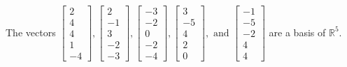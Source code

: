 \begin{exercise}
\begin{exerciseStatement}
  \end{exerciseStatement}
  \begin{exerciseAnswer}
   The vectors \(\left[\begin{array}{r}
2 \\
4 \\
4 \\
1 \\
-4
\end{array}\right] , \left[\begin{array}{r}
2 \\
-1 \\
3 \\
-2 \\
-3
\end{array}\right] , \left[\begin{array}{r}
-3 \\
-2 \\
0 \\
-2 \\
-4
\end{array}\right] , \left[\begin{array}{r}
3 \\
-5 \\
4 \\
2 \\
0
\end{array}\right] , \text{ and } \left[\begin{array}{r}
-1 \\
-5 \\
-2 \\
4 \\
4
\end{array}\right]\) 
  	 are  a basis of \(\mathbb{R}^5\).
  


  \end{exerciseAnswer}
\end{exercise}